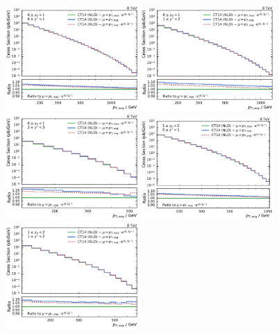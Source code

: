 \begin{figure}[htp]
    \centering
    \includegraphics[width=0.45\textwidth]{figures/theory/nlo_xs_comp_yb0ys0.pdf}\hfill
    \includegraphics[width=0.45\textwidth]{figures/theory/nlo_xs_comp_yb0ys1.pdf}
    \includegraphics[width=0.45\textwidth]{figures/theory/nlo_xs_comp_yb0ys2.pdf}\hfill
    \includegraphics[width=0.45\textwidth]{figures/theory/nlo_xs_comp_yb1ys0.pdf}
    \includegraphics[width=0.45\textwidth]{figures/theory/nlo_xs_comp_yb1ys1.pdf}\hfill

\end{figure}
